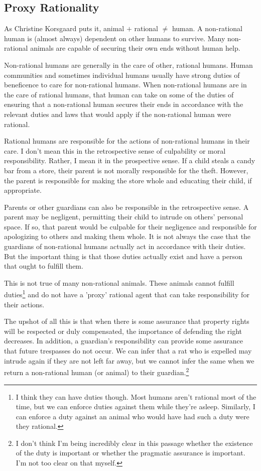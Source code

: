     \subsection{Proxy Rationality}
		As Christine Korsgaard puts it, animal $+$ rational $\neq$ human.
		A non-rational human is (almost always) dependent on other humans
		to survive. Many non-rational animals are capable of securing their
		own ends without human help.

		Non-rational humans are generally in the care of other, rational
		humans. Human communities and sometimes individual humans usually
		have strong duties of beneficence to care for non-rational humans.
		When non-rational humans are in the care of rational humans, that
		human can take on some of the duties of ensuring that a non-rational
		human secures their ends in accordance with the relevant duties
		and laws that would apply if the non-rational human were rational.

		Rational humans are responsible for the actions of non-rational
		humans in their care. I don't mean this in the retrospective sense
		of culpability or moral responsibility. Rather, I mean it in the
		prospective sense. If a child steals a candy bar from a store, their
		parent is not morally responsible for the theft. However, the parent
		is responsible for making the store whole and educating their child,
		if appropriate.

		Parents or other guardians can also be responsible in the retrospective
		sense. A parent may be negligent, permitting their child to intrude on
		others' personal space. If so, that parent would be culpable for their
		negligence and responsible for apologizing to others and making them
		whole.  It is not always the case that the guardians of non-rational
		humans actually act in accordance with their duties. But the important
		thing is that those duties actually exist and have a person that ought
		to fulfill them.

		This is not true of many non-rational animals. These animals cannot
		fulfill duties\footnote{I think they can have duties though. Most humans 
		aren't rational most of the time, but we can enforce duties against
		them while they're asleep. Similarly, I can enforce a duty against an animal
		who would have had such a duty were they rational.} and do not have
		a 'proxy' rational agent that can take responsibility for their
		actions.

		The upshot of all this is that when there is some assurance that
		property rights will be respected or duly compensated, the importance
		of defending the right decreases. In addition, a guardian's
		responsibility can provide some assurance that future trespasses do not
		occur. We can infer that a rat who is expelled may intrude again if
		they are not left far away, but we cannot infer the same when we return
		a non-rational human (or animal) to their guardian.\footnote{I don't
		think I'm being incredibly clear in this passage whether the existence
		of the duty is important or whether the pragmatic assurance is important.
		I'm not too clear on that myself.}

